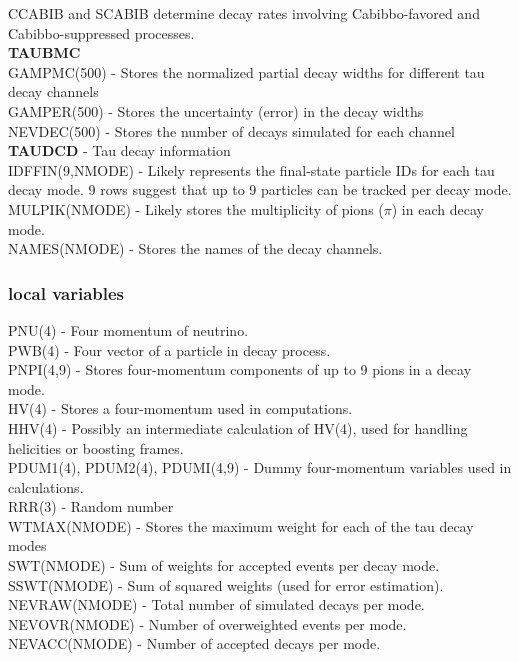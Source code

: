 \documentclass[12pt]{article}
\begin{document}
CCABIB and SCABIB determine decay rates involving Cabibbo-favored and Cabibbo-suppressed processes.\\

\textbf{TAUBMC}\\
GAMPMC(500)	- Stores the normalized partial decay widths for different tau decay channels\\
GAMPER(500) - Stores the uncertainty (error) in the decay widths\\
NEVDEC(500) - Stores the number of decays simulated for each channel\\

\textbf{TAUDCD}   -   Tau decay information\\
IDFFIN(9,NMODE)  - Likely represents the final-state particle IDs for each tau decay mode. 9 rows suggest that up to 9 particles can be tracked per decay mode.\\
MULPIK(NMODE) - Likely stores the multiplicity of pions ($\pi$) in each decay mode.\\
NAMES(NMODE)   - Stores the names of the decay channels.

\subsubsection{local variables}

PNU(4) - Four momentum of neutrino.\\
PWB(4) - Four vector of a particle in decay process.\\
PNPI(4,9) - Stores four-momentum components of up to 9 pions in a decay mode.\\
HV(4) - Stores a four-momentum used in computations.\\
HHV(4) - Possibly an intermediate calculation of HV(4), used for handling helicities or boosting frames.\\
PDUM1(4), PDUM2(4), PDUMI(4,9) - Dummy four-momentum variables used in calculations.\\

RRR(3) - Random number\\
WTMAX(NMODE) - Stores the maximum weight for each of the tau decay modes\\
SWT(NMODE) - Sum of weights for accepted events per decay mode.\\
SSWT(NMODE) - Sum of squared weights (used for error estimation).\\
NEVRAW(NMODE) - Total number of simulated decays per mode.\\
NEVOVR(NMODE) - Number of overweighted events per mode.\\
NEVACC(NMODE) - Number of accepted decays per mode.\\
\end{document}
